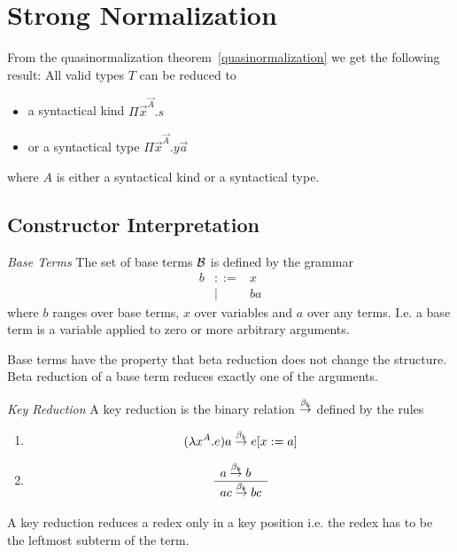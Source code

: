 \section{Strong Normalization}


From the quasinormalization theorem~\ref{quasinormalization} we get the
following result: All valid types $T$ can be reduced to

\begin{itemize}

\item a syntactical kind $\Pi \vec x^{\vec A}. s$

\item or a syntactical type $\Pi \vec x^{\vec A}. y \vec a$

\end{itemize}
%
where $A$ is either a syntactical kind or a syntactical type.


\subsection{Constructor Interpretation}



\begin{definition}
    \emph{Base Terms} The set of base terms ${\cal B}$ is defined by the
    grammar
    $$
    \begin{array}{lll}
        b &::=& x
        \\
        &\mid& b a
    \end{array}
    $$
    where $b$ ranges over base terms, $x$ over variables and $a$ over any terms.
    I.e. a base term is a variable applied to zero or more arbitrary arguments.

    Base terms have the property that beta reduction does not change the
    structure. Beta reduction of a base term reduces exactly one of the
    arguments.
\end{definition}



\begin{definition}
    \emph{Key Reduction} A key reduction is the binary relation $\stackrel{\beta_{\text{k}}}{\to}$
    defined by the rules
    \begin{enumerate}
    \item
        $$
            (\lambda x^A. e) a \stackrel{\beta_{\text{k}}}{\to} e[x:=a]
        $$

    \item
        $$
        \begin{array}{l} 
            a \stackrel{\beta_{\text{k}}}{\to} b
         \\ \hline 
            a c \stackrel{\beta_{\text{k}}}{\to} b c
        \end{array}
        $$
    \end{enumerate}
    A key reduction reduces a redex only in a key position i.e. the redex has to
    be the leftmost subterm of the term.
\end{definition}





